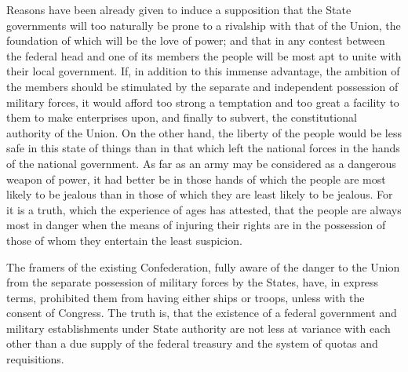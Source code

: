 Reasons have been already given to induce a supposition that the State governments will too naturally be prone to a rivalship with that of the Union, the foundation of which will be the love of power; and that in any contest between the federal head and one of its members the people will be most apt to unite with their local government. If, in addition to this immense advantage, the ambition of the members should be stimulated by the separate and independent possession of military forces, it would afford too strong a temptation and too great a facility to them to make enterprises upon, and finally to subvert, the constitutional authority of the Union. On the other hand, the liberty of the people would be less safe in this state of things than in that which left the national forces in the hands of the national government. As far as an army may be considered as a dangerous weapon of power, it had better be in those hands of which the people are most likely to be jealous than in those of which they are least likely to be jealous. For it is a truth, which the experience of ages has attested, that the people are always most in danger when the means of injuring their rights are in the possession of those of whom they entertain the least suspicion.

The framers of the existing Confederation, fully aware of the danger to the Union from the separate possession of military forces by the States, have, in express terms, prohibited them from having either ships or troops, unless with the consent of Congress. The truth is, that the existence of a federal government and military establishments under State authority are not less at variance with each other than a due supply of the federal treasury and the system of quotas and requisitions.

